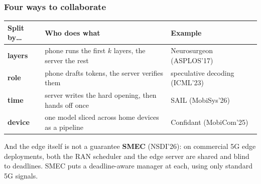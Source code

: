 \begin{frame}
\frametitle{Four ways to collaborate}
\vspace{4pt}
\centering
\small
\begin{tabular}{@{}lll@{}}
\toprule
Split by\ldots & Who does what & Example \\
\midrule
\textbf{layers} & phone runs the first $k$ layers, the server the rest & Neurosurgeon (ASPLOS'17) \\
\textbf{role} & phone drafts tokens, the server verifies them & speculative decoding (ICML'23) \\
\textbf{time} & server writes the hard opening, then hands off once & SAIL (MobiSys'26) \\
\textbf{device} & one model sliced across home devices as a pipeline & Confidant (MobiCom'25) \\
\bottomrule
\end{tabular}
\normalsize
\raggedright
\vspace{12pt}
\begin{block}{And the edge itself is not a guarantee}
\textbf{SMEC} (NSDI'26): on commercial 5G edge deployments, both the RAN scheduler and the edge server are shared and blind to deadlines. SMEC puts a deadline-aware manager at each, using only standard 5G signals.
\end{block}
\end{frame}


